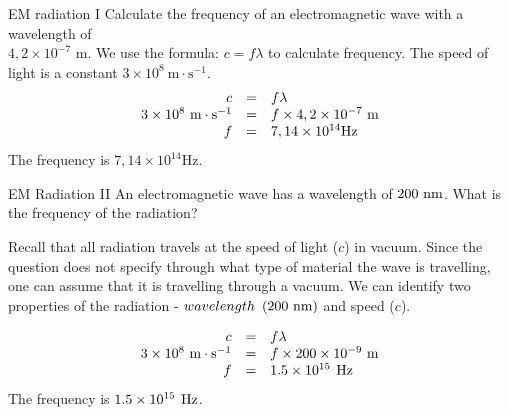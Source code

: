             \label{m38777*eip-923}
      \noindent
      \begin{wex}{EM radiation I}{
      \label{m38777*id187899}Calculate the frequency of an electromagnetic wave with a wavelength of \\ $4,2\ensuremath{\times}{10}^{-7}$ m.}
      { 
      \label{m38777*id187948}We use the formula: $c=f\lambda $ to calculate frequency. The speed of light is a constant $3\ensuremath{\times}{10}^{8}~\text{m}\cdot\text{s}^{-1}$. 
    \begin{equation*}
    \begin{array}{ccc}\hfill c& =& f\lambda \hfill \\ \hfill 3\ensuremath{\times}{10}^{8}~\text{m}\cdot\text{s}^{-1}& =& f\ensuremath{\times}4,2\ensuremath{\times}{10}^{-7}~\text{m}\hfill \\ \hfill f& =& 7,14\ensuremath{\times}{10}^{14}\text{Hz}\hfill \end{array}
      \end{equation*}
The frequency is $7,14\ensuremath{\times}{10}^{14}\text{Hz}$.}   \end{wex}
 
      \begin{wex}{EM Radiation II}{
      \label{m38777*id188123}An electromagnetic wave has a wavelength of $200\phantom{\rule{3.33333pt}{0ex}}\text{nm}$. What is the frequency of the radiation?}{
      \label{m38777*id188341}Recall that all radiation travels at the speed of light ($c$) in vacuum.
Since the question does not specify through what type of material the wave
is travelling, one can assume that it is travelling through a vacuum.
We can identify two properties of the radiation - $wavelength\phantom{\rule{3.33333pt}{0ex}}\left(200\phantom{\rule{3.33333pt}{0ex}}\text{nm}\right)$ and speed ($c$).\par 
    \begin{equation*}
    \begin{array}{ccc}\hfill c& =& f\lambda \hfill \\ \hfill 3\ensuremath{\times}{10}^{8}~\text{m}\cdot\text{s}^{-1}& =& f\ensuremath{\times}200\ensuremath{\times}{10}^{-9}~\text{m}\hfill \\ \hfill f& =& 1.5\ensuremath{\times}{10}^{15}\phantom{\rule{4pt}{0ex}}\text{Hz}\hfill \end{array}
      \end{equation*}
The frequency is $1.5\ensuremath{\times}{10}^{15}\phantom{\rule{4pt}{0ex}}\text{Hz}$.
}    \end{wex}
